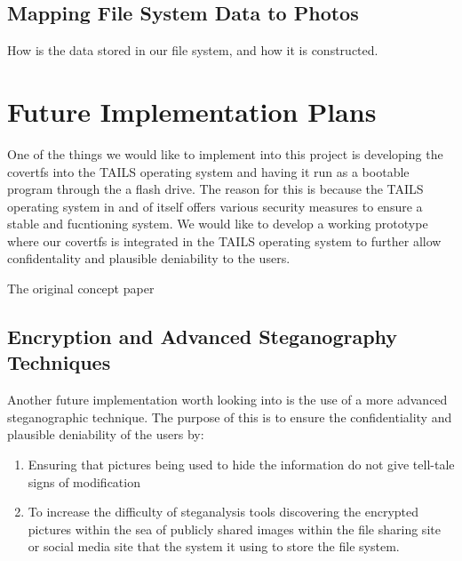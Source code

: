 \documentclass[12pt,journal,compsoc]{IEEEtran}
\begin{document}
\subsection{Mapping File System Data to Photos}

How is the data stored in our file system, and how it is constructed.






\section{Future Implementation Plans}

One of the things we would like to implement into this project is developing the covertfs into the TAILS operating system and having it run as a bootable program through the a flash drive. The reason for this is because the TAILS operating system in and of itself offers various security measures to ensure a stable and fucntioning system. We would like to develop a working prototype where our covertfs is integrated in the TAILS operating system to further allow confidentality and plausible deniability to the users. 

The original concept paper\cite{Baliga2007}

\subsection{Encryption and Advanced Steganography Techniques}

Another future implementation worth looking into is the use of a more advanced steganographic technique. The purpose of this is to ensure the confidentiality and plausible deniability of the users by:
\begin{enumerate}
\item Ensuring that pictures being used to hide the information do not give tell-tale signs of modification
\item To increase the difficulty of steganalysis tools discovering the encrypted pictures within the sea of publicly shared images within the file sharing site or social media site that the system it using to store the file system.
\end{enumerate}
\end{document}
